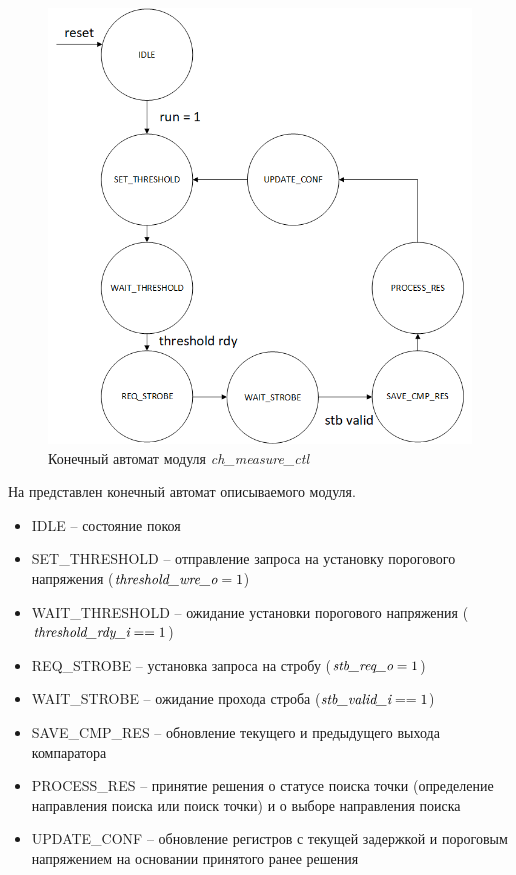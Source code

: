 \begin{figure}[ht!] 
	\center
	\includegraphics  [scale=0.7] {my_folder/images//ch_ctl}
	\caption{Конечный автомат модуля \emph{ch\_measure\_ctl}} 
	\label{fig:ch-ctl-fsm}  
\end{figure}

\FloatBarrier

На  представлен конечный автомат описываемого модуля.

\noindent
\begin{itemize}[label={}]
	\item IDLE -- состояние покоя 
	\item SET\_THRESHOLD -- отправление запроса на установку порогового напряжения ($ \emph{threshold\_wre\_o} = 1 $)
	\item WAIT\_THRESHOLD -- ожидание установки порогового напряжения ($ \emph{threshold\_rdy\_i} == 1 $)
	\item REQ\_STROBE -- установка запроса на стробу ($ \emph{stb\_req\_o} = 1 $)
	\item WAIT\_STROBE -- ожидание прохода строба ($ \emph{stb\_valid\_i} == 1 $)
	\item SAVE\_CMP\_RES -- обновление текущего и предыдущего выхода компаратора
	\item PROCESS\_RES -- принятие решения о статусе поиска точки (определение направления поиска или поиск точки)
					и о выборе направления поиска
	\item UPDATE\_CONF -- обновление регистров с текущей задержкой и пороговым напряжением на основании принятого ранее решения\\
\end{itemize}

